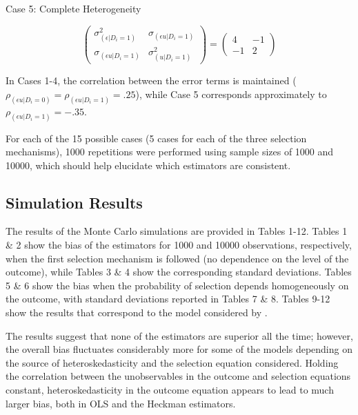 \documentclass{article}
\begin{document}
Case 5: Complete Heterogeneity

\[\left( \begin{array}{cc}
\sigma_{(\epsilon|D_i=1)}^2 & \sigma_{(\epsilon u|D_i=1)} \\
\sigma_{(\epsilon u|D_i=1)} & \sigma_{(u|D_i=1)}^2  \end{array} \right) 
=
\left( \begin{array}{cc}
4 & -1 \\
-1 & 2  \end{array} \right)\]


In Cases 1-4, the correlation between the error terms is maintained ($\rho_{(\epsilon u|D_i=0)}=\rho_{(\epsilon u|D_i=1)}=.25$), while Case 5 corresponds approximately to $\rho_{(\epsilon u|D_i=1)}=-.35$.
  
For each of the 15 possible cases (5 cases for each of the three selection mechanisms), 1000 repetitions were performed using sample sizes of 1000 and 10000, which should help elucidate which estimators are consistent.

\subsection{Simulation Results}
The results of the Monte Carlo simulations are provided in Tables 1-12.  Tables 1 \& 2 show the bias of the estimators for 1000 and 10000 observations, respectively, when the first selection mechanism is followed (no dependence on the level of the outcome), while Tables 3 \& 4 show the corresponding standard deviations.  Tables 5 \& 6 show the bias when the  probability of selection depends homogeneously on the outcome, with standard deviations reported in Tables 7 \& 8.  Tables 9-12 show the results that correspond to the model considered by \citet{reichert2014}.  

The results suggest that none of the estimators are superior all the time; however, the overall bias fluctuates considerably more for some of the models depending on the source of heteroskedasticity and the selection equation considered.  Holding the correlation between the unobservables in the outcome and selection equations constant, heteroskedasticity in the outcome equation appears to lead to much larger bias, both in OLS and the Heckman estimators.
\end{document}
